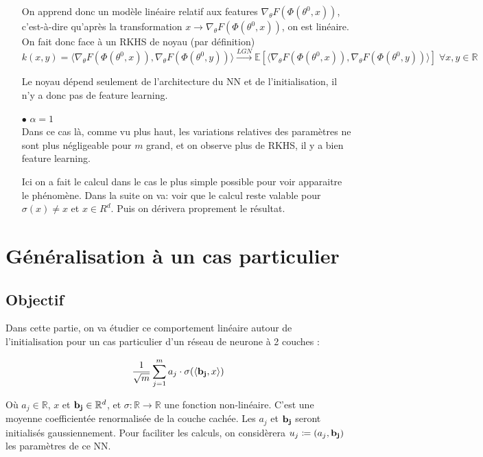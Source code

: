 \documentclass[a4paper, 11pt, french]{article}
\theoremstyle{definition}
\begin{document}
\begin{itemize}
	On apprend donc un modèle linéaire relatif aux features $\nabla_{\theta} F(\Phi(\theta^0, x))$, c'est-à-dire qu'après la transformation $x \rightarrow \nabla_{\theta} F(\Phi(\theta^0, x))$, on est linéaire. On fait donc face à un RKHS de noyau (par définition) $$k(x,y)=\langle\nabla_{\theta} F(\Phi(\theta^0, x)),\nabla_{\theta} F(\Phi(\theta^0, y))\rangle \stackrel{LGN}{\longrightarrow} \mathbb{E}[\langle\nabla_{\theta} F(\Phi(\theta^0, x)),\nabla_{\theta} F(\Phi(\theta^0, y))\rangle] \; \forall x,y \in \mathbb{R}$$
	
	Le noyau dépend seulement de l'architecture du NN et de l'initialisation, il n'y a donc pas de feature learning. \\
	
	\item[$\bullet$] $\alpha = 1$ \\

	Dans ce cas là, comme vu plus haut, les variations relatives des paramètres ne sont plus négligeable pour $m$ grand, et on observe plus de RKHS, il y a bien feature learning.
	
	
	Ici on a fait le calcul dans le cas le plus simple possible pour voir apparaitre le ph\'enom\`ene. Dans la suite on va: voir que le calcul reste valable pour $\sigma(x)\neq x$ et $x\in R^d$. Puis on d\'erivera proprement le r\'esultat. 
		
	\end{itemize}

	\section{Généralisation à un cas particulier}
	
	\subsection{Objectif}
	
	Dans cette partie, on va étudier ce comportement linéaire autour de l'initialisation pour un cas particulier d'un réseau de neurone à 2 couches :
	
	\[ \frac{1}{\sqrt{m}} \sum_{j=1}^{m} a_j \cdot \sigma (\langle {\bf b_j}, x \rangle) \]
	
	Où $a_j \in \mathbb{R}$, $x$ et ${\bf b_j} \in \mathbb{R}^d$, et $\sigma : \mathbb{R} \to \mathbb{R}$ une fonction non-linéaire. C'est une moyenne coefficientée renormalisée de la couche cachée. Les $a_j$ et ${\bf b_j}$ seront initialisés gaussiennement. Pour faciliter les calculs, on considèrera $u_j \coloneqq (a_j, {\bf b_j})$ les paramètres de ce NN.
	
\end{document}
